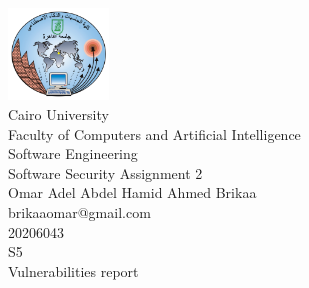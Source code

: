 \begin{titlepage}
    \begin{center}
    \includegraphics[width=0.2\textwidth]{./cu.png}\\
      \large
      Cairo University\\
      Faculty of Computers and Artificial Intelligence\\
      Software Engineering\\
      \vspace{1cm}
      \Huge
      Software Security Assignment 2\\
      \vspace{1cm}
      \Large
      Omar Adel Abdel Hamid Ahmed Brikaa\\
      brikaaomar@gmail.com\\
      20206043\\
      S5\\
      \vfill
      \large
      Vulnerabilities report\\
    \end{center}
\end{titlepage}